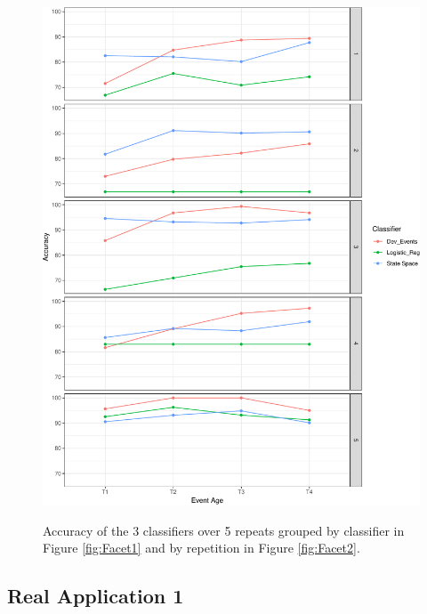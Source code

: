 \documentclass[11pt]{article}
\begin{document}
\begin{figure}[H]
{		\includegraphics[clip=true, scale=0.25]{./Graphics/3_Classifiers_2.pdf}
		\label{fig:Facet2}
	}
	\caption{\footnotesize Accuracy of the 3 classifiers over 5 repeats grouped by classifier in Figure \ref{fig:Facet1}  and  by repetition in Figure \ref{fig:Facet2}. }
	\label{fig:3Classifiers}
	\end{figure}
	
    


	
	\subsection{Real Application 1}
\end{document}
